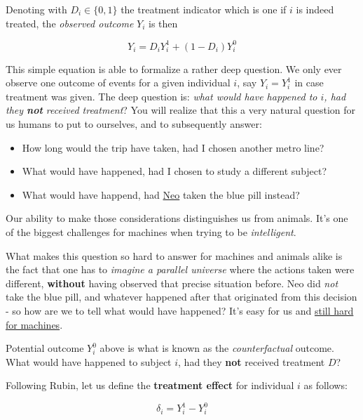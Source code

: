 \documentclass[]{book}
\providecommand{\tightlist}{%
  \setlength{\itemsep}{0pt}\setlength{\parskip}{0pt}}
\begin{document}
Denoting with \(D_i \in \{0,1\}\) the treatment indicator which is one
if \(i\) is indeed treated, the \emph{observed outcome} \(Y_i\) is then

\begin{equation}
Y_i = D_i Y_i^1 + (1-D_i)Y_i^0 \label{eq:rubin-model}
\end{equation}

This simple equation is able to formalize a rather deep question. We
only ever observe one outcome of events for a given individual \(i\),
say \(Y_i = Y_i^1\) in case treatment was given. The deep question is:
\emph{what would have happened to \(i\), had they \textbf{not} received
treatment}? You will realize that this a very natural question for us
humans to put to ourselves, and to subsequently answer:

\begin{itemize}
\tightlist
\item
  How long would the trip have taken, had I chosen another metro line?
\item
  What would have happened, had I chosen to study a different subject?
\item
  What would have happend, had
  \href{https://en.wikipedia.org/wiki/Neo_(The_Matrix)}{Neo} taken the
  blue pill instead?
\end{itemize}

Our ability to make those considerations distinguishes us from animals.
It's one of the biggest challenges for machines when trying to be
\emph{intelligent}.

What makes this question so hard to answer for machines and animals
alike is the fact that one has to \emph{imagine a parallel universe}
where the actions taken were different, \textbf{without} having observed
that precise situation before. Neo did \emph{not} take the blue pill,
and whatever happened after that originated from this decision - so how
are we to tell what would have happened? It's easy for us and
\href{https://www.quantamagazine.org/to-build-truly-intelligent-machines-teach-them-cause-and-effect-20180515/}{still
hard for machines}.

Potential outcome \(Y_i^0\) above is what is known as the
\emph{counterfactual} outcome. What would have happened to subject
\(i\), had they \textbf{not} received treatment \(D\)?

Following Rubin, let us define the \textbf{treatment effect} for
individual \(i\) as follows:

\begin{equation}
\delta_i = Y_i^1 - Y_i^0 \label{eq:TE}
\end{equation}
\end{document}
